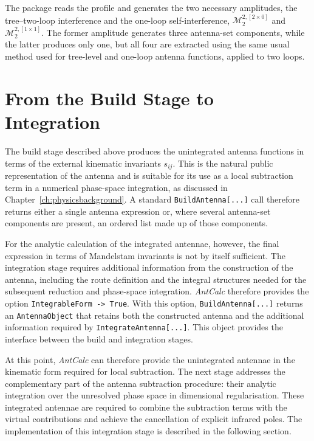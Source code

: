 

The package reads the profile and generates the two necessary amplitudes, the tree--two-loop interference and the one-loop self-interference, $\mathcal M_2^{2,[2\times 0]}$
and $\mathcal M_2^{2,[1\times 1]}$. The former amplitude generates three antenna-set 
components, while the latter produces only one, but all four are extracted using the 
same usual method used for tree-level and one-loop antenna functions, applied 
to two loops. 

\section{From the Build Stage to Integration}

The build stage described above produces the unintegrated antenna functions in terms of the
external kinematic invariants $s_{ij}$. This is the natural public representation of the
antenna and is suitable for its use as a local subtraction term in a numerical phase-space
integration, as discussed in Chapter~\ref{ch:physicsbackground}. A standard
\texttt{BuildAntenna[...]} call therefore returns either a single antenna expression or, where
several antenna-set components are present, an ordered list made up of those components.

For the analytic calculation of the integrated antennae, however, the final expression in
terms of Mandelstam invariants is not by itself sufficient. The integration stage requires
additional information from the construction of the antenna, including the route definition
and the integral structures needed for the subsequent reduction and phase-space integration.
\textit{AntCalc} therefore provides the option \texttt{IntegrableForm -> True}. With this
option, \texttt{BuildAntenna[...]} returns an \texttt{AntennaObject} that retains both the
constructed antenna and the additional information required by \texttt{IntegrateAntenna[...]}.
This object provides the interface between the build and integration stages.

At this point, \textit{AntCalc} can therefore provide the unintegrated antennae in the
kinematic form required for local subtraction. The next stage addresses the complementary part
of the antenna subtraction procedure: their analytic integration over the unresolved phase
space in dimensional regularisation. These integrated antennae are required to combine the
subtraction terms with the virtual contributions and achieve the cancellation of explicit
infrared poles. The implementation of this integration stage is described in the following
section.

